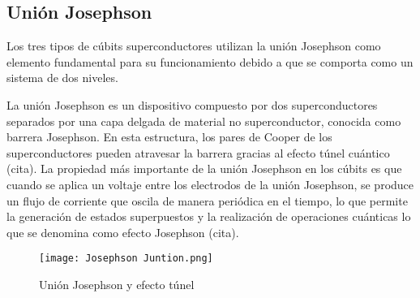 
\subsection{Unión Josephson}

Los tres tipos de cúbits superconductores utilizan la unión Josephson como elemento fundamental para su funcionamiento debido a que se comporta como un sistema de dos niveles. 

La unión Josephson es un dispositivo compuesto por dos superconductores separados por una capa delgada de material no superconductor, conocida como barrera Josephson. En esta estructura, los pares de Cooper de los superconductores pueden atravesar la barrera gracias al efecto túnel cuántico (cita). La propiedad más importante de la unión Josephson en los cúbits es que cuando se aplica un voltaje entre los electrodos de la unión Josephson, se produce un flujo de corriente que oscila de manera periódica en el tiempo, lo que permite la generación de estados superpuestos y la realización de operaciones cuánticas lo que se denomina como efecto Josephson (cita).  \\
\begin{figure}[ht]
    \centering
    \texttt{[image: Josephson Juntion.png]}
    \caption{Unión Josephson y efecto túnel \citep{noauthor_squid_nodate}}
    \label{fig:Unión Josephsone}
  \end{figure}